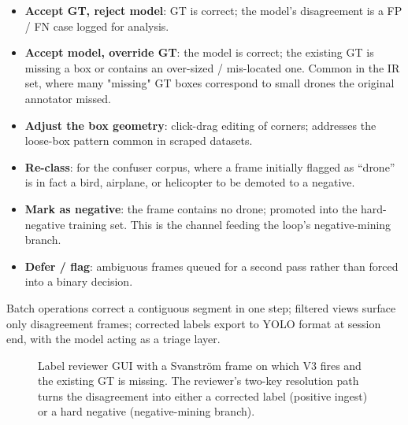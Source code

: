 \begin{itemize}
    \item \textbf{Accept GT, reject model}: GT is correct; the model's disagreement is a FP / FN case logged for analysis.
    \item \textbf{Accept model, override GT}: the model is correct; the existing GT is missing a box or contains an over-sized / mis-located one. Common in the IR set, where many "missing" GT boxes correspond to small drones the original annotator missed.
    \item \textbf{Adjust the box geometry}: click-drag editing of corners; addresses the loose-box pattern common in scraped datasets.
    \item \textbf{Re-class}: for the confuser corpus, where a frame initially flagged as ``drone'' is in fact a bird, airplane, or helicopter to be demoted to a negative.
    \item \textbf{Mark as negative}: the frame contains no drone; promoted into the hard-negative training set. This is the channel feeding the loop's negative-mining branch.
    \item \textbf{Defer / flag}: ambiguous frames queued for a second pass rather than forced into a binary decision.
\end{itemize}

Batch operations correct a contiguous segment in one step; filtered views surface only disagreement frames; corrected labels export to YOLO format at session end, with the model acting as a triage layer.

\begin{figure}[htbp]
    \centering
    \caption{Label reviewer GUI with a Svanstr\"om frame on which V3 fires and the existing GT is missing. The reviewer's two-key resolution path turns the disagreement into either a corrected label (positive ingest) or a hard negative (negative-mining branch).}
    \label{fig:label_reviewer}
\end{figure}

